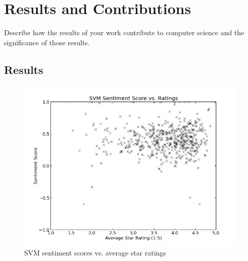 \documentclass{acm_proc_article-sp}
\begin{document}

\section{Results and Contributions}

Describe how the results of your work contribute to computer science and the significance of those results.

\subsection{Results}



\begin{figure}
\centering
\includegraphics[scale=0.4]{svm.png}
\caption{SVM sentiment scores vs. average star ratings}
\label{fig:myfig1}
\end{figure}
\end{document}
